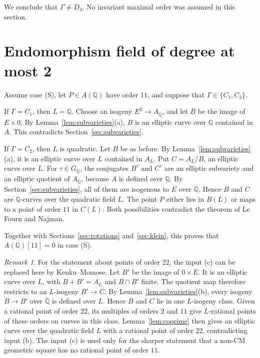 \documentclass[11pt]{article}
\theoremstyle{remark}
\newtheorem*{remark}{Remark}
\newcommand{\Q}{\mathbb Q}
\begin{document}
We conclude that \(\Gamma\neq D_4\). No invariant maximal order was
assumed in this section.

\section{Endomorphism field of degree at most 2}\label{sec:small}

Assume case (S), let \(P\in A(\Q)\) have order \(11\), and suppose
that \(\Gamma\in\{C_1,C_2\}\).

If \(\Gamma=C_1\), then \(L=\Q\). Choose an isogeny
\(E^2\to A_{\overline{\Q}}\), and let \(B\) be the image of
\(E\times0\). By Lemma~\ref{lem:subvarieties}(a), \(B\) is an elliptic
curve over \(\Q\) contained in \(A\). This contradicts
Section~\ref{sec:subvarieties}.

If \(\Gamma=C_2\), then \(L\) is quadratic. Let \(B\) be as before. By
Lemma~\ref{lem:subvarieties}(a), it is an elliptic curve over \(L\)
contained in \(A_L\). Put \(C=A_L/B\), an elliptic curve over \(L\).
For \(\tau\in G_{\Q}\), the conjugates \(B^\tau\) and \(C^\tau\) are an
elliptic subvariety and an elliptic quotient of
\(A_{\overline{\Q}}\), because \(A\) is defined over \(\Q\). By
Section~\ref{sec:subvarieties}, all of them are isogenous to \(E\) over
\(\overline{\Q}\). Hence \(B\) and \(C\) are \(\Q\)-curves over the
quadratic field \(L\). The point \(P\) either lies in \(B(L)\) or maps
to a point of order \(11\) in \(C(L)\). Both possibilities contradict
the theorem of Le Fourn and Najman.

Together with Sections~\ref{sec:rotations} and~\ref{sec:klein}, this
proves that \(A(\Q)[11]=0\) in case (S).

\begin{remark}
For the statement about points of order \(22\), the input (c) can be
replaced here by Kenku--Momose. Let \(B'\) be the image of
\(0\times E\). It is an elliptic curve over \(L\), with \(B+B'=A_L\)
and \(B\cap B'\) finite. The quotient map therefore restricts to an
\(L\)-isogeny \(B'\to C\). By Lemma~\ref{lem:subvarieties}(b), every
isogeny \(B\to B'\) over \(\overline{\Q}\) is defined over \(L\). Hence
\(B\) and \(C\) lie in one \(L\)-isogeny class. Given a rational point
of order \(22\), its multiples of orders \(2\) and \(11\) give
\(L\)-rational points of these orders on curves in this class.
Lemma~\ref{lem:coprime} then gives an elliptic curve over the quadratic
field \(L\) with a rational point of order \(22\), contradicting input
(b). The input (c) is used only for the sharper statement that a
non-CM geometric square has no rational point of order \(11\).
\end{remark}
\end{document}

